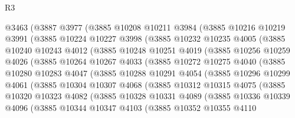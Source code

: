 \begin{lexlean}{R3}
\begin{coremodule}
    @3463
      (@3887
        @3977
        (@3885
          @10208
          @10211
          @3984
          (@3885
            @10216
            @10219
            @3991
            (@3885
              @10224
              @10227
              @3998
              (@3885
                @10232
                @10235
                @4005
                (@3885
                  @10240
                  @10243
                  @4012
                  (@3885
                    @10248
                    @10251
                    @4019
                    (@3885
                      @10256
                      @10259
                      @4026
                      (@3885
                        @10264
                        @10267
                        @4033
                        (@3885
                          @10272
                          @10275
                          @4040
                          (@3885
                            @10280
                            @10283
                            @4047
                            (@3885
                              @10288
                              @10291
                              @4054
                              (@3885
                                @10296
                                @10299
                                @4061
                                (@3885
                                  @10304
                                  @10307
                                  @4068
                                  (@3885
                                    @10312
                                    @10315
                                    @4075
                                    (@3885
                                      @10320
                                      @10323
                                      @4082
                                      (@3885
                                        @10328
                                        @10331
                                        @4089
                                        (@3885
                                          @10336
                                          @10339
                                          @4096
                                          (@3885
                                            @10344
                                            @10347
                                            @4103
                                            (@3885
                                              @10352
                                              @10355
                                              @4110

\end{coremodule}
\end{lexlean}
